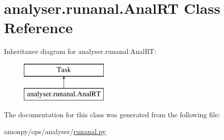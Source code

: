 \hypertarget{classanalyser_1_1runanal_1_1_anal_r_t}{\section{analyser.\-runanal.\-Anal\-R\-T Class Reference}
\label{classanalyser_1_1runanal_1_1_anal_r_t}
}
Inheritance diagram for analyser.\-runanal.\-Anal\-R\-T\-:\begin{figure}[H]
\begin{center}
\leavevmode
\includegraphics[height=2.000000cm]{classanalyser_1_1runanal_1_1_anal_r_t}
\end{center}
\end{figure}


The documentation for this class was generated from the following file\-:\begin{DoxyCompactItemize}
\item 
amonpy/ops/analyser/\hyperlink{runanal_8py}{runanal.\-py}\end{DoxyCompactItemize}
